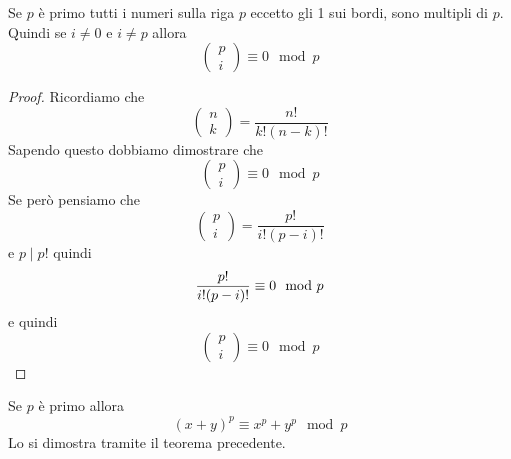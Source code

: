 \begin{theorem}
	Se $p$ \`e primo tutti i numeri sulla riga $p$ eccetto gli 1 sui bordi, sono multipli
	di $p$. Quindi se $i \neq 0$ e $i \neq p$ allora
	\begin{equation*}
		\begin{pmatrix}
			p \\ i
		\end{pmatrix} \equiv 0 \mod{p}
	\end{equation*}
	\begin{proof}
		Ricordiamo che
		\begin{equation*}
			\begin{pmatrix}
				n \\ k
			\end{pmatrix} =
			\frac{n!}{k! (n - k)!}
		\end{equation*}
		Sapendo questo dobbiamo dimostrare che
		\begin{equation*}
			\begin{pmatrix}
				p \\ i
			\end{pmatrix} \equiv 0 \mod{p}
		\end{equation*}
		Se per\`o pensiamo che
		\begin{equation*}
			\begin{pmatrix}
				p \\ i
			\end{pmatrix} =
			\frac{p!}{i! (p - i)!}
		\end{equation*}
		e $p \mid p!$ quindi
		\begin{equation*}
			\frac{p!}{i! (p - i)!} \equiv 0 \mod{p} \\
		\end{equation*}
		e quindi
		\begin{equation*}
			\begin{pmatrix}
				p \\ i
			\end{pmatrix} \equiv 0 \mod{p}
		\end{equation*}
	\end{proof}
\end{theorem}

\begin{proposition}
	Se $p$ \`e primo allora
	\begin{equation*}
		(x + y)^p \equiv x^p + y^p \mod{p}
	\end{equation*}
	Lo si dimostra tramite il teorema precedente.
\end{proposition}

